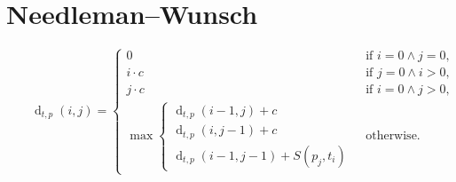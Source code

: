 \clearpage
\section{Needleman--Wunsch}

\begin{equation*}
  \qquad\operatorname{d}_{t,p}(i,j) =
  \begin{cases}
    0 & \text{ if } i=0 \land j = 0,\\
    i \cdot c & \text{ if } j=0 \land i > 0, \\
    j \cdot c & \text{ if } i=0 \land j > 0, \\
    \max
      \begin{cases}
        \operatorname{d}_{t,p}(i-1,j) + c \\
        \operatorname{d}_{t,p}(i,j-1) + c \\
        \operatorname{d}_{t,p}(i-1,j-1) + S(p_j,t_i)
      \end{cases} & \text{ otherwise.}
  \end{cases}
\end{equation*}


